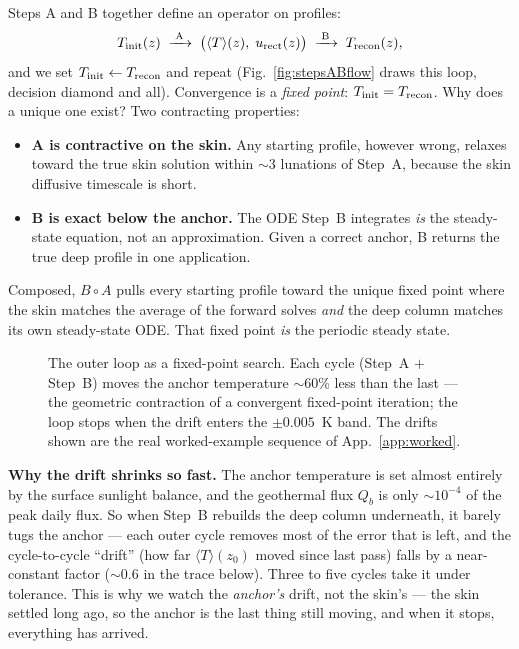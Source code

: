 \documentclass[11pt]{report}
\newcommand{\Tm}{\langle T\rangle}
\begin{document}
Steps A and B together define an operator on profiles:
\[
T_{\rm init}(z)\;\xrightarrow{\;\text{A}\;}\;\bigl(\Tm(z),\;u_{\rm rect}(z)\bigr)
\;\xrightarrow{\;\text{B}\;}\;T_{\rm recon}(z),
\]
and we set $T_{\rm init}\leftarrow T_{\rm recon}$ and repeat
(Fig.~\ref{fig:stepsABflow} draws this loop, decision diamond and all).
Convergence is a
\emph{fixed point}: $T_{\rm init}=T_{\rm recon}$. Why does a unique one exist?
Two contracting properties:
\begin{itemize}[leftmargin=1.4em,itemsep=2pt]
\item \textbf{A is contractive on the skin.} Any starting profile, however wrong,
  relaxes toward the true skin solution within $\sim$3 lunations of Step~A,
  because the skin diffusive timescale is short.
\item \textbf{B is exact below the anchor.} The ODE Step~B integrates \emph{is}
  the steady-state equation, not an approximation. Given a correct anchor, B
  returns the true deep profile in one application.
\end{itemize}
Composed, $B\circ A$ pulls every starting profile toward the unique fixed point
where the skin matches the average of the forward solves \emph{and} the deep
column matches its own steady-state ODE. That fixed point \emph{is} the periodic
steady state.

\begin{figure}[htbp]\centering

\caption{The outer loop as a fixed-point search. Each cycle (Step~A $+$
Step~B) moves the anchor temperature $\sim$60\% less than the last ---
the geometric contraction of a convergent fixed-point iteration; the loop
stops when the drift enters the $\pm 0.005$~K band. The drifts shown are
the real worked-example sequence of App.~\ref{app:worked}.}
\label{fig:fixedpoint}
\end{figure}

\begin{plain}
\textbf{Why the drift shrinks so fast.} The anchor temperature is set almost
entirely by the surface sunlight balance, and the geothermal flux $Q_b$ is only
${\sim}10^{-4}$ of the peak daily flux. So when Step~B rebuilds the deep column
underneath, it barely tugs the anchor --- each outer cycle removes most of the
error that is left, and the cycle-to-cycle ``drift'' (how far $\Tm(z_0)$ moved
since last pass) falls by a near-constant factor ($\sim$0.6 in the trace below).
Three to five cycles take it under tolerance. This is why we watch the
\emph{anchor's} drift, not the skin's --- the skin settled long ago, so the
anchor is the last thing still moving, and when it stops, everything has arrived.
\end{plain}
\end{document}
